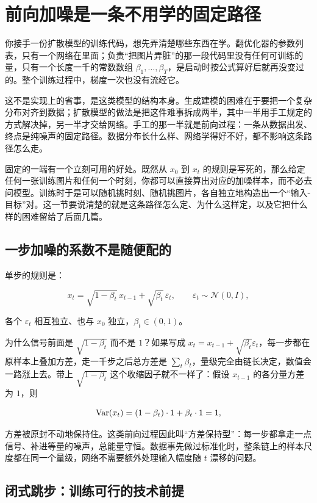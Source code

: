 \section{前向加噪是一条不用学的固定路径}
\label{sec:14-Deep-Learning/08-Diffusion-Models/01}

你接手一份扩散模型的训练代码，想先弄清楚哪些东西在学。翻优化器的参数列表，只有一个网络在里面；负责``把图片弄脏''的那一段代码里没有任何可训练的量，只有一个长度一千的常数数组 \(\beta_1,\dots,\beta_T\)，是启动时按公式算好后就再没变过的。整个训练过程中，梯度一次也没有流经它。

这不是实现上的省事，是这类模型的结构本身。生成建模的困难在于要把一个复杂分布对齐到数据；扩散模型的做法是把这件难事拆成两半，其中一半用手工规定的方式解决掉，另一半才交给网络。手工的那一半就是前向过程：一条从数据出发、终点是纯噪声的固定路径。数据分布长什么样、网络学得好不好，都不影响这条路径怎么走。

固定的一端有一个立刻可用的好处。既然从 \(x_0\) 到 \(x_t\) 的规则是写死的，那么给定任何一张训练图片和任何一个时刻，你都可以直接算出对应的加噪样本，而不必去问模型。训练时于是可以随机挑时刻、随机挑图片，各自独立地构造出一个``输入-目标''对。这一节要说清楚的就是这条路径怎么定、为什么这样定，以及它把什么样的困难留给了后面几篇。

\subsection{一步加噪的系数不是随便配的}

单步的规则是：

\[
x_t = \sqrt{1-\beta_t}\,x_{t-1} + \sqrt{\beta_t}\,\varepsilon_t,
\qquad \varepsilon_t\sim\mathcal N(0,I),
\]

各个 \(\varepsilon_t\) 相互独立、也与 \(x_0\) 独立，\(\beta_t\in(0,1)\)。

为什么信号前面是 \(\sqrt{1-\beta_t}\) 而不是 \(1\)？如果写成 \(x_t = x_{t-1}+\sqrt{\beta_t}\varepsilon_t\)，每一步都在原样本上叠加方差，走一千步之后总方差是 \(\sum_t\beta_t\)，量级完全由链长决定，数值会一路涨上去。带上 \(\sqrt{1-\beta_t}\) 这个收缩因子就不一样了：假设 \(x_{t-1}\) 的各分量方差为 \(1\)，则

\[
\operatorname{Var}(x_t) = (1-\beta_t)\cdot 1 + \beta_t\cdot 1 = 1,
\]

方差被原封不动地保持住。这类前向过程因此叫``方差保持型''：每一步都拿走一点信号、补进等量的噪声，总能量守恒。数据事先做过标准化时，整条链上的样本尺度都在同一个量级，网络不需要额外处理输入幅度随 \(t\) 漂移的问题。

\subsection{闭式跳步：训练可行的技术前提}


